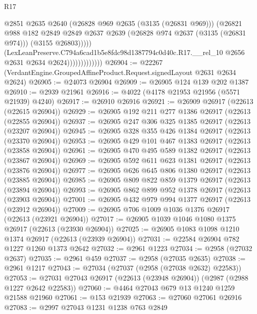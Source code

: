 \begin{lexlean}{R17}
\begin{coremodule}
                                  @2851
                                  @2635
                                  @2640
                                  (@26828 @969 @2635 (@3135 (@26831 @969)))
                                  (@26821
                                    @988
                                    @182
                                    @2849
                                    @2849
                                    @2637
                                    @2639
                                    (@26828 @974 @2637 (@3135 (@26831 @974)))
                                    (@3155 @26803)))))
                            (LexLeanPreserve.C794a6cad1b5e8fdc98d1387794c0d40c.R17.__rel_10
                              @2656
                              @2631
                              @2634
                              @2624)))))))))))))
@26904 := @22267 (VerdantEngine.GroupedAffineProduct.Request.signedLayout @2631 @2634 @2624)
@26905 := @24073 @26904
@26909 := @26905 @124 @139 @202 @1387
@26910 := @2939 @21961
@26916 := @4022 (@4178 @21953 @21956 (@5571 @21939) @4240)
@26917 := @26910 @26916
@26921 := @26909 @26917 (@22613 (@22615 @26904))
@26929 := @26905 @192 @211 @277 @1386 @26917 (@22613 (@22855 @26904))
@26937 := @26905 @247 @306 @325 @1385 @26917 (@22613 (@23207 @26904))
@26945 := @26905 @328 @355 @426 @1384 @26917 (@22613 (@23370 @26904))
@26953 := @26905 @429 @101 @467 @1383 @26917 (@22613 (@23858 @26904))
@26961 := @26905 @470 @495 @589 @1382 @26917 (@22613 (@23867 @26904))
@26969 := @26905 @592 @611 @623 @1381 @26917 (@22613 (@23876 @26904))
@26977 := @26905 @626 @645 @806 @1380 @26917 (@22613 (@23885 @26904))
@26985 := @26905 @809 @822 @859 @1379 @26917 (@22613 (@23894 @26904))
@26993 := @26905 @862 @899 @952 @1378 @26917 (@22613 (@23903 @26904))
@27001 := @26905 @432 @979 @994 @1377 @26917 (@22613 (@23912 @26904))
@27009 := @26905 @706 @1009 @1036 @1376 @26917 (@22613 (@23921 @26904))
@27017 := @26905 @1039 @1046 @1080 @1375 @26917 (@22613 (@23930 @26904))
@27025 := @26905 @1083 @1098 @1210 @1374 @26917 (@22613 (@23939 @26904))
@27031 := @22584 @26904 @782 @1227 @1260 @1373 @2642
@27032 := @2961 @1223
@27034 := @2958 (@27032 @2637)
@27035 := @2961 @459
@27037 := @2958 (@27035 @2635)
@27038 := @2961 @1217
@27043 := @27034 (@27037 (@2958 (@27038 @2632) @22583))
@27053 := @27031 @27043 @26917 (@22613 (@23948 @26904)) (@2987 (@2988 @1227 @2642 @22583))
@27060 := @4464 @27043 @679 @13 @1240 @1259 @21588 @21960
@27061 := @153 @21939
@27063 := @27060 @27061 @26916
@27083 := @2997
    @27043
    @1231
    @1238
    @763
    @2849

\end{coremodule}
\end{lexlean}
